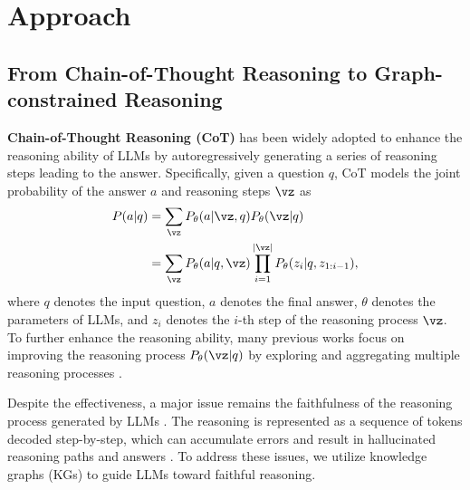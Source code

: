 \section{Approach}\label{sec:approach}

\subsection{From Chain-of-Thought Reasoning to Graph-constrained Reasoning}

\noindent\textbf{Chain-of-Thought Reasoning (CoT)} \citep{wei2022chain} has been widely adopted to enhance the reasoning ability of LLMs by autoregressively generating a series of reasoning steps leading to the answer. Specifically, given a question $q$, CoT models the joint probability of the answer $a$ and reasoning steps $\vz$ as 
\begin{equation}
    \setlength\abovedisplayskip{2pt}%
    \begin{aligned}
    P(a|q) &=\sum_{\vz} P_\theta(a|\vz,q)P_\theta(\vz|q) \\
    & =\sum_{\vz} P_\theta(a|q, \vz)\prod_{i=1}^{|\vz|}P_\theta(z_i|q, z_{1:i-1}),\label{eq:cot}
    \end{aligned}
\end{equation}
where $q$ denotes the input question, $a$ denotes the final answer, $\theta$ denotes the parameters of LLMs, and $z_i$ denotes the $i$-th step of the reasoning process $\vz$. To further enhance the reasoning ability, many previous works focus on improving the reasoning process $P_{\theta}(\vz|q)$ by exploring and aggregating multiple reasoning processes \citep{wangself,yao2024tree}. 


Despite the effectiveness, a major issue remains the faithfulness of the reasoning process generated by LLMs \citep{huanglarge}. The reasoning is represented as a sequence of tokens decoded step-by-step, which can accumulate errors and result in hallucinated reasoning paths and answers \citep{nguyen-etal-2024-direct}. To address these issues, we utilize knowledge graphs (KGs) to guide LLMs toward faithful reasoning.

